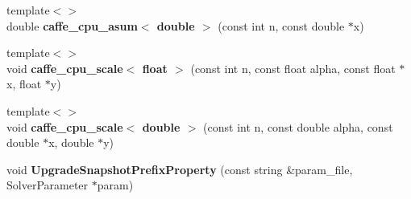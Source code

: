 \begin{DoxyCompactItemize}
\item 
{\footnotesize template$<$$>$ }\\double {\bfseries caffe\+\_\+cpu\+\_\+asum$<$ double $>$} (const int n, const double $\ast$x)\hypertarget{namespacecaffe_a1e9591a34f95ee26700fc5e60d35518c}{}\label{namespacecaffe_a1e9591a34f95ee26700fc5e60d35518c}

\item 
{\footnotesize template$<$$>$ }\\void {\bfseries caffe\+\_\+cpu\+\_\+scale$<$ float $>$} (const int n, const float alpha, const float $\ast$x, float $\ast$y)\hypertarget{namespacecaffe_a8652e05695145f9dfd4304117106a8f6}{}\label{namespacecaffe_a8652e05695145f9dfd4304117106a8f6}

\item 
{\footnotesize template$<$$>$ }\\void {\bfseries caffe\+\_\+cpu\+\_\+scale$<$ double $>$} (const int n, const double alpha, const double $\ast$x, double $\ast$y)\hypertarget{namespacecaffe_a104637443c3bd34c155a32bd29bb9150}{}\label{namespacecaffe_a104637443c3bd34c155a32bd29bb9150}

\item 
void {\bfseries Upgrade\+Snapshot\+Prefix\+Property} (const string \&param\+\_\+file, Solver\+Parameter $\ast$param)\hypertarget{namespacecaffe_a5ecdd6b870a4002b429466b83d2bb3b9}{}\label{namespacecaffe_a5ecdd6b870a4002b429466b83d2bb3b9}

\end{DoxyCompactItemize}
